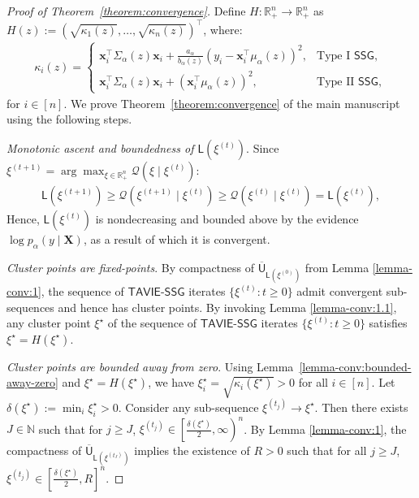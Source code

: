 \documentclass[12pt]{article}
\numberwithin{equation}{section}
\newcommand{\tssg}{\mathsf{TAVIE}\text{-}\mathsf{SSG}}
\begin{document}
\begin{proof}[Proof of Theorem~\ref{theorem:convergence}]
Define $H: \mathbb{R}_{+}^{n} \to \mathbb{R}^{n}_{+}$ as $H(z) := \left(\sqrt{\kappa_1(z)}, \ldots, \sqrt{\kappa_n(z)}\right)^{\top}$, where:
\begin{align}\label{supp-eq:kappa-Type-I-II}
    \kappa_i(z) = \begin{cases}
        \mathbf{x}_i^{\top}\Sigma_{\alpha}(z) \mathbf{x}_i + \frac{a_\alpha}{b_{\alpha}(z)}\left(y_i - \mathbf{x}_{i}^{\top}\mu_{\alpha}(z)\right)^2, &\text{Type I } \mathsf{SSG},\\
        \mathbf{x}_i^{\top}\Sigma_{\alpha}(z)\mathbf{x}_i + \left(\mathbf{x}_i^{\top}\mu_{\alpha}(z)\right)^{2}, & \text{Type II } \mathsf{SSG},
    \end{cases}
\end{align}
for $i\in [n]$. We prove Theorem~\ref{theorem:convergence} of the main manuscript using the following steps.

\noindent

\emph{Monotonic ascent and boundedness of $\mathsf{L}(\xi^{(t)})$}.
Since $\xi^{(t+1)} = \arg\max_{\xi \in \mathbb{R}_{+}^{n}}\mathcal{Q}(\xi\mid \xi^{(t)})$:
\begin{align}\label{eq:P.1}
    \mathsf{L}(\xi^{(t+1)}) \geq \mathcal{Q}(\xi^{(t+1)}\mid \xi^{(t)}) \geq \mathcal{Q}(\xi^{(t)}\mid \xi^{(t)}) = \mathsf{L}(\xi^{(t)}),
\end{align}
Hence, $\mathsf{L}(\xi^{(t)})$ is nondecreasing and bounded above by the evidence $\log p_{\alpha}(y\mid \mathbf{X})$, as a result of which it is convergent.

\noindent
\emph{Cluster points are fixed-points}. 
By compactness of $\overline{\mathsf{U}}_{\mathsf{L}(\xi^{(0)})}$ from Lemma \ref{lemma-conv:1}, the sequence of $\tssg$ iterates $\{\xi^{(t)}: t\geq 0\}$ admit convergent sub-sequences and hence has cluster points.
By invoking Lemma \ref{lemma-conv:1.1}, any cluster point $\xi^{\star}$ of the sequence of $\tssg$ iterates $\{\xi^{(t)}: t\geq 0\}$ satisfies $\xi^{\star} = H(\xi^{\star})$.

\noindent
\emph{Cluster points are bounded away from zero}. Using Lemma~\ref{lemma-conv:bounded-away-zero} and $\xi^{\star} = H(\xi^{\star})$, we have $\xi_i^{\star} = \sqrt{\kappa_i(\xi^{\star})} > 0$ for all $i\in [n]$. Let $\delta(\xi^{\star}) := \min_i \xi_i^{\star} > 0$. Consider any sub-sequence $\xi^{(t_j)} \to \xi^{\star}$. Then there exists $J \in \mathbb{N}$ such that for $j \geq J$, $\xi^{(t_j)} \in \left[\tfrac{\delta(\xi^{\star})}{2}, \infty\right)^{n}$. By Lemma \ref{lemma-conv:1}, the compactness of $\overline{\mathsf{U}}_{\mathsf{L}(\xi^{(t_J)})}$ implies the existence of $R>0$ such that for all $j\geq J$, $\xi^{(t_j)} \in \left[\tfrac{\delta(\xi^{\star})}{2}, R\right]^{n}$.


\end{proof}
\end{document}

